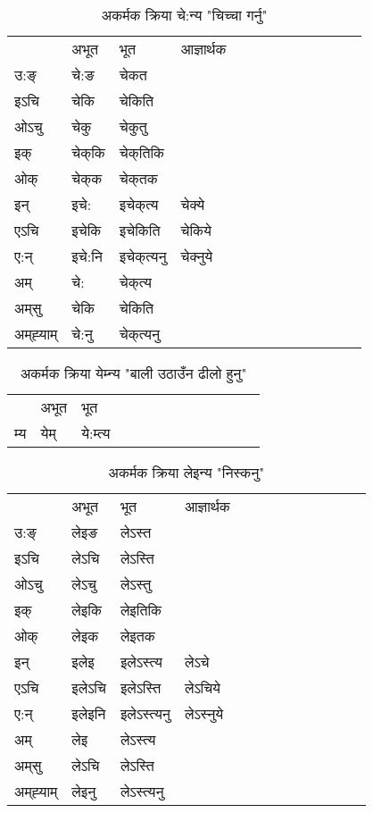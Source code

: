 \begin{table}[H]
\centering
\caption{\label{ek.vi} अकर्मक क्रिया  चे:न्य  "चिच्चा गर्नु"  }
\begin{tabular}{l|l|l|l|l|l|l|l|l|l|l|l|l}  \toprule
&अभूत & भूत & आज्ञार्थक \\ 
उ:ङ्‌ &चे:ङ &चेकत \\ 
इऽचि &चेकि &चेकिति   \\ 
ओऽचु &चेकु &चेकुतु   \\ 
इक् &चेक्‌कि &चेक्‌तिकि   \\ 
ओक् &चेक्‌क &चेक्‌तक   \\ 
इन् & इचे: & इचेक्‌त्य &चेक्ये  \\ 
एऽचि & इचेकि & इचेकिति &चेकिये    \\ 
ए:न् & इचे:नि  & इचेक्‌त्यनु &चेक्‍नुये  \\ 
अम् & चे: & चेक्‌त्य   \\ 
अम्‌सु & चेकि & चेकिति   \\ 
अम्‌ह्‍याम् & चे:नु  & चेक्‌त्यनु \\ 
\bottomrule
\end{tabular}
\end{table}


\begin{table}[H]
\centering
\caption{\label{em.vi} अकर्मक क्रिया  येम्‍न्य  "बाली उठाउँन ढीलो हुनु"  }
\begin{tabular}{l|l|l|l|l|l|l|l|l|l|l|l|l}  \toprule
&अभूत & भूत   \\ 
म्य & येम् & ये:म्त्य   \\ 
\bottomrule
\end{tabular}
\end{table}


\begin{table}[H]
\centering
\caption{\label{en.vi} अकर्मक क्रिया  लेइन्य  "निस्कनु"  }
\begin{tabular}{l|l|l|l|l|l|l|l|l|l|l|l|l}  \toprule
&अभूत & भूत & आज्ञार्थक \\ 
उ:ङ्‌ &लेइङ &लेऽस्त \\ 
इऽचि &लेऽचि &लेऽस्ति   \\ 
ओऽचु &लेऽचु &लेऽस्तु   \\ 
इक् &लेइकि &लेइतिकि   \\ 
ओक् &लेइक &लेइतक   \\ 
इन् & इलेइ & इलेऽस्त्य &लेऽचे  \\ 
एऽचि & इलेऽचि & इलेऽस्ति &लेऽचिये    \\ 
ए:न् & इलेइनि  & इलेऽस्त्यनु &लेऽस्‍नुये  \\ 
अम् & लेइ & लेऽस्त्य   \\ 
अम्‌सु & लेऽचि & लेऽस्ति   \\ 
अम्‌ह्‍याम् & लेइनु  & लेऽस्त्यनु \\ 
\bottomrule
\end{tabular}
\end{table}



